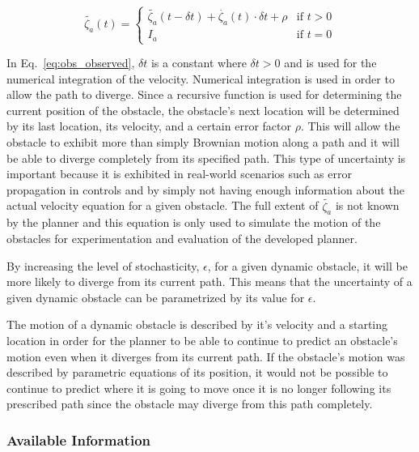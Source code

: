 \documentclass[letterpaper, 10pt, conference]{ieeeconf}
\begin{document}
\begin{equation}
    \tilde{\zeta_a}(t) =
        \begin{cases}
            \tilde{\zeta_a}(t - \delta t) + \dot{\zeta_a}(t) \cdot \delta t
            + \rho
            & \text{if } t > 0 \\
            I_a & \text{if } t = 0
        \end{cases}
    \label{eq:obs_observed}
\end{equation}

In Eq.~\ref{eq:obs_observed}, $\delta t$ is a constant where $\delta t > 0$ and
is used for the numerical integration of the velocity. Numerical integration is
used in order to allow the path to diverge. Since a recursive function is used
for determining the current position of the obstacle, the obstacle's next
location will be determined by its last location, its velocity, and a certain
error factor $\rho$. This will allow the obstacle to exhibit more than simply
Brownian motion along a path and it will be able to diverge completely from its
specified path. This type of uncertainty is important because it is exhibited
in real-world scenarios such as error propagation in controls and by simply not
having enough information about the actual velocity equation for a given
obstacle. The full extent of $\tilde{\zeta_a}$ is not known by the planner and
this equation is only used to simulate the motion of the obstacles for
experimentation and evaluation of the developed planner.

By increasing the level of stochasticity, $\epsilon$, for a given dynamic
obstacle, it will be more likely to diverge from its current path. This means
that the uncertainty of a given dynamic obstacle can be parametrized by its
value for $\epsilon$.

The motion of a dynamic obstacle is described by it's velocity and a starting
location in order for the planner to be able to continue to predict an
obstacle's motion even when it diverges from its current path. If the
obstacle's motion was described by parametric equations of its position, it
would not be possible to continue to predict where it is going to move once it
is no longer following its prescribed path since the obstacle may diverge from
this path completely.

\subsubsection{Available Information}
\end{document}
